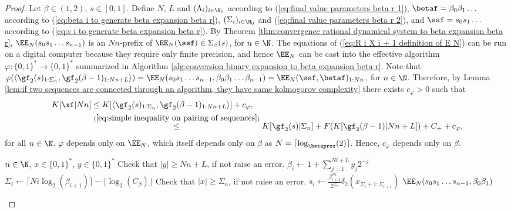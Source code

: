 \begin{proof}
	Let $\beta \in (1,2)$, $s \in [0,1]$. Define $N$, $L$ and $(\Lambda_i)_{i \in \N_0}$ according to (\ref{eq:final value parameters beta r 1}), $\betaf = \beta_0\beta_1\ldots$ according to (\ref{eq:beta i to generate beta expansion beta r}), $(\Sigma_i)_{i \in \N_0}$  and (\ref{eq:final value parameters beta r 2}),  and $\ssf = s_0s_1\ldots $ according to (\ref{eq:s i to generate beta expansion beta r}). By Theorem \ref{thm:convergence rational dynamical system to beta expansion beta r}, $\EE_N(s_0s_1\ldots s_{n-1})$ is an $Nn$-prefix of $\EE_N(\ssf) \in \Sigma_\beta(s)$, for $n \in \N$. The equations of (\ref{eq:R i X i + 1 definition of E N}) can be run on a digital computer because they require only finite precision, and hence $\EE_N$ can be cast into the effective algorithm $\varphi : \{0,1\}^\ast \to \{0,1\}^\ast$ summarized in Algorithm \ref{alg:conversion binary expansion to beta expansion beta r}. Note that $\varphi(\langle\gf_2(s)_{1:\Sigma_n}, \gf_2(\beta-1)_{1:Nn+L}\rangle) = \EE_N(s_0s_1\ldots s_{n-1},\beta_0\beta_1\ldots \beta_{n-1}) = \EE_N(\ssf,\betaf)_{1:Nn}$, for $n \in \N$. Therefore, by Lemma \ref{lem:if two sequences are connected through an algorithm, they have same kolmogorov complexity} there exists $c_\varphi > 0$ such that
	\begin{align}
		K[\xf|N n] &\leq K[\langle\gf_2(s)_{1:\Sigma_n}, \gf_2(\beta-1)_{1:Nn+L}\rangle] + c_\varphi,\\
		&\overset{(\ref{eq:simple inequality on pairing of sequences})}{\leq}  K[\gf_2(s)|\Sigma_n] +F(K[\gf_2(\beta-1)|Nn+L]) + C_+ + c_\varphi,
	\end{align}
	for all $n \in \N$. $\varphi$ depends only on $\EE_N$, which itself depends only on $\beta$ as $N = \lceil \log_{\betaprox}(2) \rceil$. Hence, $c_\varphi$ depends only on $\beta$.
	\begin{algorithm}[H]
		\caption{$\beta$-expansion from a binary expansion}\label{alg:conversion binary expansion to beta expansion beta r}
		\begin{algorithmic}[1]
			\Require $n \in \N$, $x \in \{0,1\}^\ast$, $y \in \{0,1\}^\ast$
			\State Check that $|y| \geq Nn+L$, if not raise an error.
			\State $\beta_i \gets 1 + \sum_{j=1}^{Ni+L} y_{j} 2^{-j}$
			\EndFor
			\State $\Sigma_i \gets \lceil Ni\log_2(\beta_{i+1}) \rceil - \lfloor \log_2(C_\beta) \rfloor$
			\EndFor
			\State Check that $|x| \geq \Sigma_n$, if not raise an error.
			\State $s_i \gets \frac{\beta_{i+1}^{Ni}}{2^{\Sigma_i}}\delta_2(x_{\Sigma_i+1:\Sigma_{i+1}})$
			\EndFor
			\State \Return $\EE_N(s_0s_1\ldots s_{n-1}, \beta_0\beta_1)$
		\end{algorithmic}
	\end{algorithm}
\end{proof}

